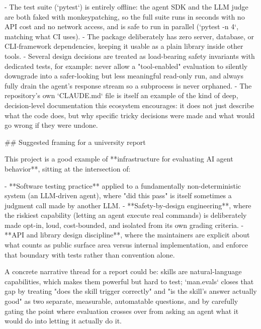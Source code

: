 - The test suite (`pytest`) is entirely offline: the agent SDK and the LLM judge are both faked with monkeypatching, so the full suite runs in seconds with no API cost and no network access, and is safe to run in parallel (`pytest -n 4`, matching what CI uses).
- The package deliberately has zero server, database, or CLI-framework dependencies, keeping it usable as a plain library inside other tools.
- Several design decisions are treated as load-bearing safety invariants with dedicated tests, for example: never allow a "tool-enabled" evaluation to silently downgrade into a safer-looking but less meaningful read-only run, and always fully drain the agent's response stream so a subprocess is never orphaned.
- The repository's own `CLAUDE.md` file is itself an example of the kind of deep, decision-level documentation this ecosystem encourages: it does not just describe what the code does, but why specific tricky decisions were made and what would go wrong if they were undone.

## Suggested framing for a university report

This project is a good example of **infrastructure for evaluating AI agent behavior**, sitting at the intersection of:

- **Software testing practice** applied to a fundamentally non-deterministic system (an LLM-driven agent), where "did this pass" is itself sometimes a judgment call made by another LLM.
- **Safety-by-design engineering**, where the riskiest capability (letting an agent execute real commands) is deliberately made opt-in, loud, cost-bounded, and isolated from its own grading criteria.
- **API and library design discipline**, where the maintainers are explicit about what counts as public surface area versus internal implementation, and enforce that boundary with tests rather than convention alone.

A concrete narrative thread for a report could be: skills are natural-language capabilities, which makes them powerful but hard to test; `man.evals` closes that gap by treating "does the skill trigger correctly" and "is the skill's answer actually good" as two separate, measurable, automatable questions, and by carefully gating the point where evaluation crosses over from asking an agent what it would do into letting it actually do it.
